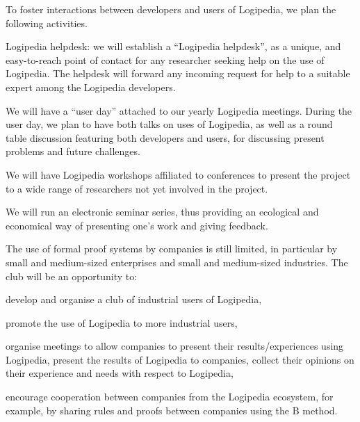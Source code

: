 \begin{workpackage}[id=dissemination,type=MGT,wphases=1-48,
  short={Dissemination},
  title={Dissemination, communication and exploitation},
  lead=Lie,LieRM=3,InrRM=6,BirRM=4,CleRM=2,ImtRM=2,StrRM=2,ZibRM=14,EduRM=12]
\begin{tasklist}
  \begin{task}[id=researchers-club,
      title=Expanding the use of Logipedia in research,
      shorttitle=Research,
      lead=Bir,BirRM=2,wphases=1-48!.05]
     To foster interactions between developers and users of Logipedia, we plan the following activities.
\begin{compactitem}
\item Logipedia helpdesk: we will establish a ``Logipedia helpdesk'',
  as a unique, and easy-to-reach point of contact for any researcher
  seeking help on the use of Logipedia.  The helpdesk will forward any
  incoming request for help to a suitable expert among the Logipedia
  developers.
\item We will have a ``user day'' attached to our yearly Logipedia
  meetings.  During the user day, we plan to have both talks on uses
  of Logipedia, as well as a round table discussion featuring both
  developers and users, for discussing present problems and future
  challenges.
\item We will have Logipedia workshops affiliated to conferences to
  present the project to a wide range of researchers not yet involved
  in the project.
  \item We will run an electronic seminar series, thus providing an
    ecological and economical way of presenting one's work and giving
    feedback.
    \end{compactitem}
  \end{task}

  \begin{task}[id=industrial-club,
    title=Expanding the use of Logipedia in the industry,
    shorttitle=Industry, lead=Cle,CleRM=2,wphases=1-48!.05] The use of
    formal proof systems by companies is still limited, in particular
    by small and medium-sized enterprises and small and medium-sized
    industries. The club will be an opportunity to:
    \begin{compactitem}
    \item develop and organise a club of industrial users of Logipedia,
    \item promote the use of Logipedia to more industrial users,
    \item organise meetings to allow companies to present their results/experiences using Logipedia, present the results of Logipedia to companies, collect their opinions on their experience and needs with respect to Logipedia,
    \item encourage cooperation between companies from the Logipedia
      ecosystem, for example, by sharing rules and proofs between companies using the B method.
    \end{compactitem}
  \end{task}


\end{tasklist}
\end{workpackage}
